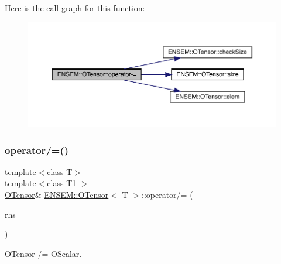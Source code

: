 Here is the call graph for this function\+:
\nopagebreak
\begin{figure}[H]
\begin{center}
\leavevmode
\includegraphics[width=350pt]{da/d8a/classENSEM_1_1OTensor_a8a087d8889bb41eafd237e270e4182fa_cgraph}
\end{center}
\end{figure}
\mbox{\label{classENSEM_1_1OTensor_a02520659679c7946a5bb0ce75b3824cb}} 
\subsubsection{\texorpdfstring{operator/=()}{operator/=()}\hspace{0.1cm}{\footnotesize\ttfamily [1/4]}}
{\footnotesize\ttfamily template$<$class T$>$ \\
template$<$class T1 $>$ \\
\mbox{\hyperlink{classENSEM_1_1OTensor}{O\+Tensor}}\& \mbox{\hyperlink{classENSEM_1_1OTensor}{E\+N\+S\+E\+M\+::\+O\+Tensor}}$<$ T $>$\+::operator/= (\begin{DoxyParamCaption}\item[{const \mbox{\hyperlink{classENSEM_1_1OScalar}{O\+Scalar}}$<$ T1 $>$ \&}]{rhs }\end{DoxyParamCaption})\hspace{0.3cm}{\ttfamily [inline]}}



\mbox{\hyperlink{classENSEM_1_1OTensor}{O\+Tensor}} /= \mbox{\hyperlink{classENSEM_1_1OScalar}{O\+Scalar}}. 


